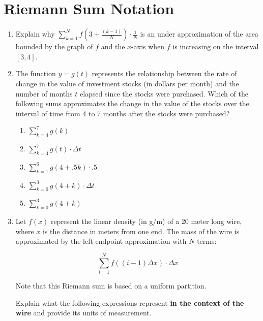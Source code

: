 \documentclass[12pt]{report}
\begin{document}
\newcommand{\less}{\textless}
\newcommand{\greater}{\textgreater}
\newcommand{\reals}{\mathbb{R}}
\newcommand{\integers}{\mathbb{Z}}
\newcommand{\rationals}{\mathbb{Q}}
\newcommand{\dsp}{\displaystyle}

\section*{Riemann Sum Notation}
\begin{enumerate}

\item Explain why $\sum_{k=1}^N f\left(3+\frac{(k-1)}{N}\right)\cdot\frac{1}{N}$ is an under approximation of the area bounded by the graph of $f$ and the $x$-axis when $f$ is increasing on the interval $[3, 4]$.

\item The function $y=g(t)$ represents the relationship between the rate of change in the value of investment stocks (in dollars per month) and the number of months $t$ elapsed since the stocks were purchased. Which of the following sums approximates the change in the value of the stocks over the interval of time from 4 to 7 months after the stocks were purchased?

\begin{enumerate}

\item $\sum_{k=4}^7g(k)$

\item $\sum_{k=4}^7g(t)\cdot\Delta t$

\item $\sum_{k=1}^6g(4+.5k)\cdot .5$

\item $\sum_{k=0}^3g(4+k)\cdot \Delta t$

\item $\sum_{k=0}^3g(4+k)$

\end{enumerate}



\item Let $f(x)$ represent the linear density (in g/m) of a 20 meter long wire, where $x$ is the distance in meters from one end. The mass of the wire is approximated by the left endpoint approximation with $N$ terms:

$$\sum_{i=1}^N f((i-1)\Delta x)\cdot \Delta x$$

Note that this Riemann sum is based on a uniform partition.

Explain what the following expressions represent {\bf in the context of the wire} and provide its units of measurement. 


\end{enumerate}
\end{document}
